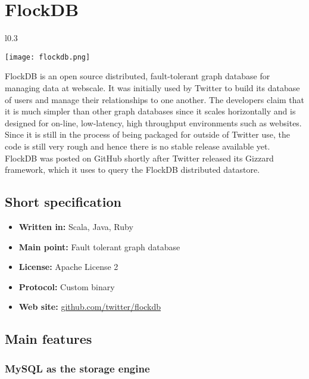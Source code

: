 \chapter{FlockDB}

\begin{wrapfigure}{l}{0.3\textwidth}
  \vspace{-75pt}
  \begin{center}
    \texttt{[image: flockdb.png]}
  \end{center}
  \vspace{-30pt}
\end{wrapfigure}
FlockDB is an open source distributed, fault-tolerant graph database for managing data at webscale. It was initially used by Twitter to build its database of users and manage their relationships to one another. The developers claim that it is much simpler than other graph databases since it scales horizontally and is designed for on-line, low-latency, high throughput environments such as websites. Since it is still in the process of being packaged for outside of Twitter use, the code is still very rough and hence there is no stable release available yet. FlockDB was posted on GitHub shortly after Twitter released its Gizzard framework, which it uses to query the FlockDB distributed datastore. 

\section{Short specification}

\begin{itemize}
  \item \textbf{Written in:} Scala, Java, Ruby
  \item \textbf{Main point:} Fault tolerant graph database
  \item \textbf{License:} Apache License 2
  \item \textbf{Protocol:} Custom binary
  \item \textbf{Web site:} \href{https://github.com/twitter/flockdb}{github.com/twitter/flockdb}
\end{itemize}

\section{Main features}

\subsection{MySQL as the storage engine}


